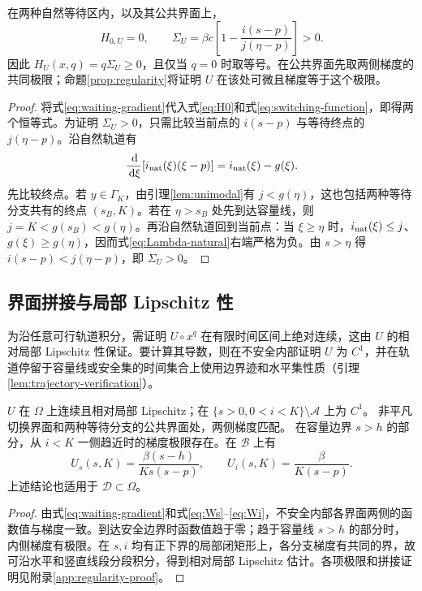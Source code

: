\documentclass[lang=cn,a4paper,newtx]{elegantpaper}
\theoremstyle{plain}
\theoremstyle{definition}
\newcommand{\Acal}{\mathcal A}
\newcommand{\Dcal}{\mathcal D}
\newcommand{\dd}{\,\mathrm d}
\begin{document}
\begin{lemma}
\label{lem:waiting-HJB}
在两种自然等待区内，以及其公共界面上，
\begin{equation}
H_{0,U}=0,\qquad
\Sigma_U=\beta c\left[1-\frac{i(s-p)}{j(\eta-p)}\right]>0.
\label{eq:waiting-HJB}
\end{equation}
因此 $H_U(x,q)=q\Sigma_U\ge0$，且仅当 $q=0$ 时取等号。在公共界面先取两侧梯度的共同极限；命题\ref{prop:regularity}将证明 $U$ 在该处可微且梯度等于这个极限。
\end{lemma}
\begin{proof}
将式\eqref{eq:waiting-gradient}代入式\eqref{eq:H0}和式\eqref{eq:switching-function}，即得两个恒等式。为证明 $\Sigma_U>0$，只需比较当前点的 $i(s-p)$ 与等待终点的 $j(\eta-p)$。沿自然轨道有
\begin{equation}
\frac{\dd}{\dd\xi}[i_{\rm nat}(\xi)(\xi-p)]=i_{\rm nat}(\xi)-g(\xi).
\label{eq:Lambda-natural}
\end{equation}
先比较终点。若 $y\in\Gamma_K$，由引理\ref{lem:unimodal}有 $j<g(\eta)$，这也包括两种等待分支共有的终点 $(s_B,K)$。若在 $\eta>s_B$ 处先到达容量线，则 $j=K<g(s_B)<g(\eta)$。再沿自然轨道回到当前点：当 $\xi\ge\eta$ 时，$i_{\rm nat}(\xi)\le j$、$g(\xi)\ge g(\eta)$，因而式\eqref{eq:Lambda-natural}右端严格为负。由 $s>\eta$ 得 $i(s-p)<j(\eta-p)$，即 $\Sigma_U>0$。
\end{proof}

\subsection{界面拼接与局部 Lipschitz 性}
为沿任意可行轨道积分，需证明 $U\circ x^q$ 在有限时间区间上绝对连续，这由 $U$ 的相对局部 Lipschitz 性保证。要计算其导数，则在不安全内部证明 $U$ 为 $C^1$，并在轨道停留于容量线或安全集的时间集合上使用边界迹和水平集性质（引理\ref{lem:trajectory-verification}）。

\begin{proposition}
\label{prop:regularity}
$U$ 在 $\Omega$ 上连续且相对局部 Lipschitz；在
$\{s>0,0<i<K\}\setminus\Acal$ 上为 $C^1$。
非平凡切换界面和两种等待分支的公共界面处，两侧梯度匹配。
在容量边界 $s>h$ 的部分，从 $i<K$ 一侧趋近时的梯度极限存在。在 $\mathcal B$ 上有
\begin{equation}
U_s(s,K)=\frac{\beta(s-h)}{Ks(s-p)},\qquad U_i(s,K)=\frac \beta{K(s-p)}.
\label{eq:capacity-gradient}
\end{equation}
上述结论也适用于 $\Dcal\subset\Omega$。
\end{proposition}
\begin{proof}
由式\eqref{eq:waiting-gradient}和式\eqref{eq:Ws}--\eqref{eq:Wi}，不安全内部各界面两侧的函数值与梯度一致。到达安全边界时函数值趋于零；趋于容量线 $s>h$ 的部分时，内侧梯度有极限。在 $s,i$ 均有正下界的局部闭矩形上，各分支梯度有共同的界，故可沿水平和竖直线段分段积分，得到相对局部 Lipschitz 估计。各项极限和拼接证明见附录\ref{app:regularity-proof}。
\end{proof}
\end{document}

